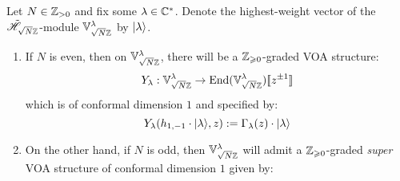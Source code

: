             \begin{proposition} \label{prop: (super)_VOA_structures_on_weyl_vacuum_modules}
                Let $N \in \mathbb{Z}_{> 0}$ and fix some $\lambda \in \mathbb{C}^*$. Denote the highest-weight vector of the $\tilde{\mathscr{H}}_{\sqrt{N} \mathbb{Z}}$-module $\mathbb{V}_{\sqrt{N} \mathbb{Z}}^{\lambda}$ by $\lvert {\lambda} \rangle$. 
                \begin{enumerate}
                    \item If $N$ is even, then on $\mathbb{V}_{\sqrt{N} \mathbb{Z}}^{\lambda}$, there will be a $\mathbb{Z}_{\geqslant 0}$-graded VOA structure:
                        $$Y_{\lambda}: \mathbb{V}_{\sqrt{N} \mathbb{Z}}^{\lambda} \to \mathrm{End}(\mathbb{V}_{\sqrt{N} \mathbb{Z}}^{\lambda})[\![z^{\pm 1}]\!]$$
                    which is of conformal dimension $1$ and specified by:
                        $$Y_{\lambda}(h_{1, -1} \cdot \lvert {\lambda} \rangle, z) := \Gamma_{\lambda}(z) \cdot \lvert {\lambda} \rangle$$
                    \item On the other hand, if $N$ is odd, then $\mathbb{V}_{\sqrt{N} \mathbb{Z}}^{\lambda}$ will admit a $\mathbb{Z}_{\geqslant 0}$-graded \textit{super} VOA structure of conformal dimension $1$ given by:
                \end{enumerate}
            \end{proposition}
